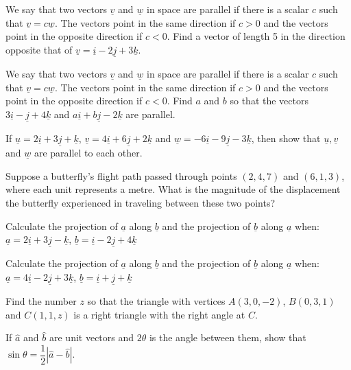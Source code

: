 \documentclass[11pt,a4paper]{article}
\begin{document}
\begin{longlist}
\item We say that two vectors $\underline{v}$ and $\underline{w}$ in space are parallel if there is a scalar $c$ such that $\underline{v}=c\underline{w}$. The vectors point in the same direction if $c>0$ and the vectors point in the opposite direction if $c<0$. Find a vector of length 5 in the direction opposite that of $\underline{v}=\underline{i}-2\underline{j}+3\underline{k}$.

\item We say that two vectors $\underline{v}$ and $\underline{w}$ in space are parallel if there is a scalar $c$ such that $\underline{v}=c\underline{w}$. The vectors point in the same direction if $c>0$ and the vectors point in the opposite direction if $c<0$. Find $a$ and $b$ so that the vectors $3\underline{i}-\underline{j}+4\underline{k}$ and $a\underline{i}+b\underline{j}-2\underline{k}$ are parallel.

\item If $\underline{u}=2\underline{i}+3\underline{j}+\underline{k}$, $\underline{v}=4\underline{i}+6\underline{j}+2\underline{k}$ and $\underline{w}=-6\underline{i}-9\underline{j}-3\underline{k}$, then show that $\underline{u}, \underline{v}$ and $\underline{w}$ are parallel to each other.

\item Suppose a butterfly's flight path passed through points $(2,4,7)$ and $(6,1,3)$, where each unit represents a metre. What is the magnitude of the displacement the butterfly experienced in traveling between these two points?

\item Calculate the projection of $\underline{a}$ along $\underline{b}$ and the projection of $\underline{b}$ along $\underline{a}$ when: $\underline{a}=2\underline{i}+3\underline{j}-\underline{k}$, $\underline{b}=\underline{i}-2\underline{j}+4\underline{k}$

\item Calculate the projection of $\underline{a}$ along $\underline{b}$ and the projection of $\underline{b}$ along $\underline{a}$ when: $\underline{a}=4\underline{i}-2\underline{j}+3\underline{k}$, $\underline{b}=\underline{i}+\underline{j}+\underline{k}$

\item Find the number $z$ so that the triangle with vertices $A(3,0,-2)$, $B(0,3,1)$ and $C(1,1,z)$ is a right triangle with the right angle at $C$.

\item If $\hat{a}$ and $\hat{b}$ are unit vectors and $2\theta$ is the angle between them, show that $\sin\theta = \dfrac{1}{2}|\hat{a}-\hat{b}|$.


\end{longlist}
\end{document}
